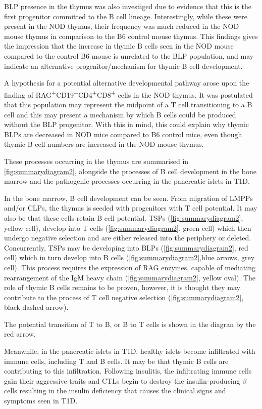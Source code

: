 BLP presence in the thymus was also investiged due to evidence that this is the first progenitor committed to the B cell lineage. 
Interestingly, while these were present in the NOD thymus, their frequency was much reduced in the NOD mouse thymus in comparison to the B6 control mouse thymus.
This findings gives the impression that the increase in thymic B cells seen in the NOD mouse compared to the control B6 mouse is unrelated to the BLP population, and may indicate an alternative progenitor/mechanism for thymic B cell development.

A hypothesis for a potential alternative developmental pathway arose upon the finding of RAG\textsuperscript{+}CD19\textsuperscript{+}CD4\textsuperscript{+}CD8\textsuperscript{+} cells in the NOD thymus.
It was postulated that this population may represent the midpoint of a T cell transitioning to a B cell and this may present a mechanism by which B cells could be produced without the BLP progenitor.
With this in mind, this could explain why thymic BLPs are decreased in NOD mice compared to B6 control mice, even though thymic B cell numbers are increased in the NOD mouse thymus.

These processes occurring in the thymus are summarised in \cref{fig:summarydiagram2}, alongside the processes of B cell development in the bone marrow and the pathogenic processes occurring in the pancreatic islets in T1D.

In the bone marrow, B cell development can be seen.
From migration of LMPPs and/or CLPs, the thymus is seeded with progenitors with T cell potential.
It may also be that these cells retain B cell potential.
TSPs (\cref{fig:summarydiagram2}, yellow cell), develop into T cells (\cref{fig:summarydiagram2}, green cell) which then undergo negative selection and are either released into the periphery or deleted.
Concurrently, TSPs may be developing into BLPs (\cref{fig:summarydiagram2}, red cell) which in turn develop into B cells (\cref{fig:summarydiagram2},blue arrows, grey cell).
This process requires the expression of RAG enzymes, capable of mediating rearrangement of the IgM heavy chain (\cref{fig:summarydiagram2}, yellow oval).
The role of thymic B cells remains to be proven, however, it is thought they may contribute to the process of T cell negative selection (\cref{fig:summarydiagram2}, black dashed arrow).

The potential transition of T to B, or B to T cells is shown in the diagran by the red arrow.

Meanwhile, in the pancreatic islets in T1D, healthy islets become infiltrated with immune cells, including T and B cells. It may be that thymic B cells are contributing to this infiltration.
Following insulitis, the infiltrating immune cells gain their aggressive traits and CTLs begin to destroy the insulin-producing $\beta$ cells resulting in the insulin deficiency that causes the clinical signs and symptoms seen in T1D.


